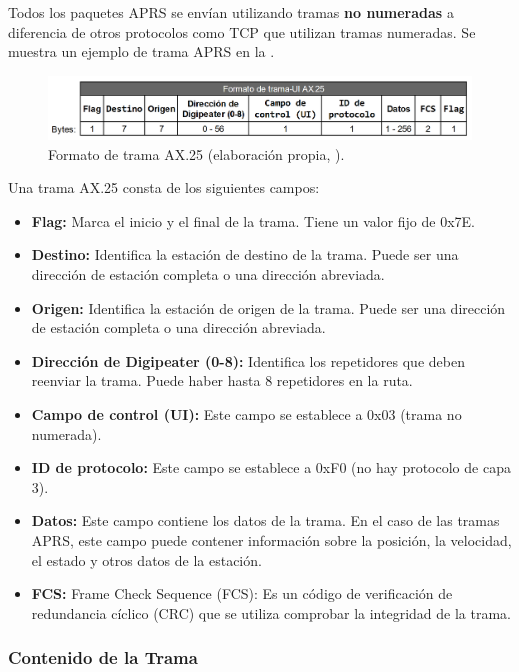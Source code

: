 Todos los paquetes APRS se envían utilizando tramas \textbf{no numeradas} a diferencia de otros protocolos como TCP que utilizan tramas numeradas. Se muestra un ejemplo de trama APRS en la .

\begin{figure}[h]
	\centering
	\includegraphics[width=1\textwidth]{Imagenes/Chapter_4/AX.25Frame.png}
	\caption[Formato de trama AX.25.]{Formato de trama AX.25 (elaboración propia, \cite{APRSProtocol}).}
	\label{fig:aprs-frame}
\end{figure}

Una trama AX.25 consta de los siguientes campos:
\begin{itemize}
	\item \textbf{Flag:} Marca el inicio y el final de la trama. Tiene un valor fijo de 0x7E.
	\item \textbf{Destino:} Identifica la estación de destino de la trama. Puede ser una dirección de estación completa o una dirección abreviada.
	\item \textbf{Origen:} Identifica la estación de origen de la trama. Puede ser una dirección de estación completa o una dirección abreviada.
	\item \textbf{Dirección de Digipeater (0-8):} Identifica los repetidores que deben reenviar la trama. Puede haber hasta 8 repetidores en la ruta.
	\item \textbf{Campo de control (UI):} Este campo se establece a 0x03 (trama no numerada).
	\item \textbf{ID de protocolo:} Este campo se establece a 0xF0 (no hay protocolo de capa 3).
	\item \textbf{Datos:} Este campo contiene los datos de la trama. En el caso de las tramas APRS, este campo puede contener información sobre la posición, la velocidad, el estado y otros datos de la estación.
	\item \textbf{FCS:} Frame Check Sequence (FCS): Es un código de verificación de redundancia cíclico (CRC) que se utiliza comprobar la integridad de la trama.
\end{itemize}


\subsubsection*{Contenido de la Trama}

